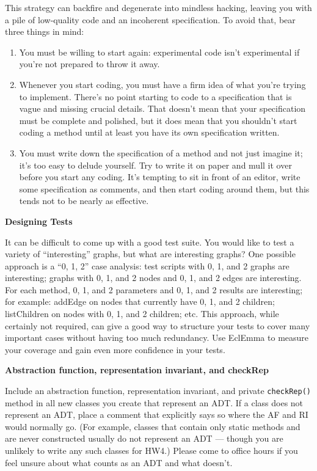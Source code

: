 \documentclass[11pt]{article}
\begin{document}
\noindent This strategy can backfire and degenerate into mindless hacking, leaving you with a pile of low-quality code and an incoherent specification. To avoid that, bear three things in mind:

\begin{enumerate}
\item You must be willing to start again: experimental code isn't experimental if you're not prepared to throw it away.
\item Whenever you start coding, you must have a firm idea of what you're trying to implement. There's no point starting to code to a specification that is vague and missing crucial details. That doesn't mean that your specification must be complete and polished, but it does mean that you shouldn't start coding a method until at least you have its own specification written.
\item You must write down the specification of a method and not just imagine it; it's too easy to delude yourself. Try to write it on paper and mull it over before you start any coding. It's tempting to sit in front of an editor, write some specification as comments, and then start coding around them, but this tends not to be nearly as effective.
\end{enumerate}

\noindent \large{\textbf{Designing Tests}}

\noindent It can be difficult to come up with a good test suite. You would like to test a variety of “interesting” graphs, but what are interesting graphs? One possible approach is a “0, 1, 2” case analysis: test scripts with 0, 1, and 2 graphs are interesting; graphs with 0, 1, and 2 nodes and 0, 1, and 2 edges are interesting. For each method, 0, 1, and 2 parameters and 0, 1, and 2 results are interesting; for example: addEdge on nodes that currently have 0, 1, and 2 children; listChildren on nodes with 0, 1, and 2 children; etc. This approach, while certainly not required, can give a good way to structure your tests to cover many important cases without having too much redundancy. Use EclEmma to measure your coverage and gain even more confidence in your tests.

\newpage

\noindent \large{\textbf{Abstraction function, representation invariant, and checkRep}}

\noindent Include an abstraction function, representation invariant, and private \texttt{checkRep()} method in all new classes you create that represent an ADT. If a class does not represent an ADT, place a comment that explicitly says so where the AF and RI would normally go. (For example, classes that contain only static methods and are never constructed usually do not represent an ADT — though you are unlikely to write any such classes for HW4.) Please come to office hours if you feel unsure about what counts as an ADT and what doesn't.
\end{document}
